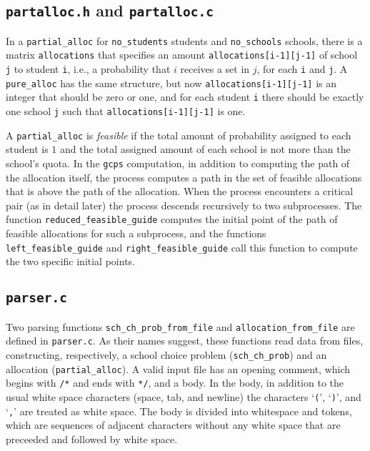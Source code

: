 \documentclass[12pt]{article}
\theoremstyle{definition}
\begin{document}
\begin{appendix}
\subsection{\texttt{partalloc.h} and \texttt{partalloc.c}}

In a \texttt{partial\_alloc} for \texttt{no\_students} students and
\texttt{no\_schools} schools, there is a matrix \texttt{allocations}
that specifies an amount \texttt{allocations[i-1][j-1]} of school
\texttt{j} to student \texttt{i}, i.e., a probability that $i$
receives a set in $j$, for each \texttt{i} and \texttt{j}.  A
\texttt{pure\_alloc} has the same structure, but now
\texttt{allocations[i-1][j-1]} is an integer that should be zero or
one, and for each student \texttt{i} there should be exactly one
school \texttt{j} such that \texttt{allocations[i-1][j-1]} is one.

A \texttt{partial\_alloc} is \emph{feasible} if the total amount of
probability assigned to each student is $1$ and the total assigned
amount of each school is not more than the school's quota.  In the
\texttt{gcps} computation, in addition to computing the path of the
allocation itself, the process computes a path in the set of feasible
allocations that is above the path of the allocation.  When the
process encounters a critical pair (as in detail later) the process
descends recursively to two subprocesses.  The function
\texttt{reduced\_feasible\_guide} computes the initial point of the
path of feasible allocations for such a subprocess, and the functions
\texttt{left\_feasible\_guide} and \texttt{right\_feasible\_guide}
call this function to compute the two specific initial points.

\subsection{\texttt{parser.c}}

Two parsing functions \texttt{sch\_ch\_prob\_from\_file} and
\texttt{allocation\_from\_file} are defined in \texttt{parser.c}.  As
their names suggest, these functions read data from files,
constructing, respectively, a school choice problem
(\texttt{sch\_ch\_prob}) and an allocation (\texttt{partial\_alloc}).
A valid input file has an opening comment, which begins with
\texttt{/*} and ends with \texttt{*/}, and a body.  In the body, in
addition to the usual white space characters (space, tab, and newline)
the characters `\texttt{(}', `\texttt{)}', and `\texttt{,}' are
treated as white space.  The body is divided into whitespace and
tokens, which are sequences of adjacent characters without any white
space that are preceeded and followed by white space.


\end{appendix}
\end{document}
